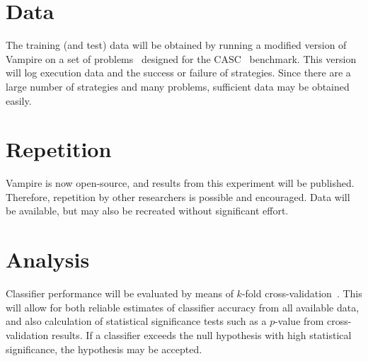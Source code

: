 \documentclass{article}
\begin{document}
\section{Data}
The training (and test) data will be obtained by running a modified version of Vampire on a set of problems~\cite{TPTP} designed for the CASC~\cite{CASC} benchmark.
This version will log execution data and the success or failure of strategies.
Since there are a large number of strategies and many problems, sufficient data may be obtained easily.

\section{Repetition}
Vampire is now open-source, and results from this experiment will be published.
Therefore, repetition by other researchers is possible and encouraged.
Data will be available, but may also be recreated without significant effort.

\section{Analysis}
Classifier performance will be evaluated by means of \(k\)-fold cross-validation~\cite{cross-validation}.
This will allow for both reliable estimates of classifier accuracy from all available data, and also calculation of statistical significance tests such as a \(p\)-value from cross-validation results.
If a classifier exceeds the null hypothesis with high statistical significance, the hypothesis may be accepted.



\end{document}
